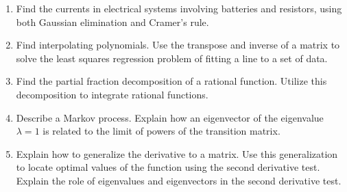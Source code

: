 \begin{enumerate}

\item Find the currents in electrical systems involving batteries and resistors, using both Gaussian elimination and Cramer's rule.
\item Find interpolating polynomials. Use the transpose and inverse of a matrix to solve the least squares regression problem of fitting a line to a set of data.
\item Find the partial fraction decomposition of a rational function. Utilize this decomposition to integrate rational functions.
\item Describe a Markov process. Explain how an eigenvector of the eigenvalue $\lambda=1$ is related to the limit of powers of the transition matrix.
\item Explain how to generalize the derivative to a matrix. Use this generalization to locate optimal values of the function using the second derivative test. Explain the role  of eigenvalues and eigenvectors in the second derivative test.
\end{enumerate}
